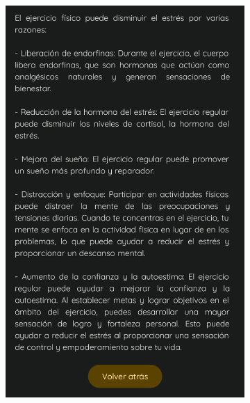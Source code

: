             \begin{figure}[htbp]
                \centering
                \begin{subfigure}[c]{0.4\textwidth}
                    \centering
                    \includegraphics[width=1\textwidth]{figures/pruebas/visualizacion_individual/Consejo estres.png}
                \end{subfigure}
                \hspace{0.1\textwidth}
                \begin{subfigure}[c]{0.4\textwidth}
                    \centering

\end{subfigure}
\end{figure}
